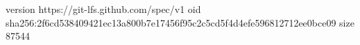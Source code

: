 version https://git-lfs.github.com/spec/v1
oid sha256:2f6cd538409421ec13a800b7e17456f95c2c5cd5f4d4efe596812712ee0bce09
size 87544
